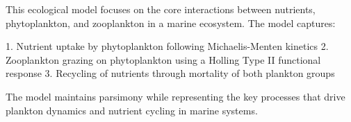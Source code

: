 This ecological model focuses on the core interactions between nutrients, phytoplankton, and zooplankton in a marine ecosystem. The model captures:

1. Nutrient uptake by phytoplankton following Michaelis-Menten kinetics
2. Zooplankton grazing on phytoplankton using a Holling Type II functional response
3. Recycling of nutrients through mortality of both plankton groups

The model maintains parsimony while representing the key processes that drive plankton dynamics and nutrient cycling in marine systems.
